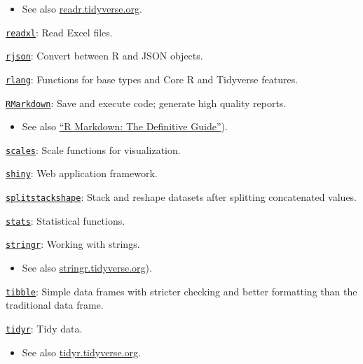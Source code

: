\documentclass[]{book}
\providecommand{\tightlist}{%
  \setlength{\itemsep}{0pt}\setlength{\parskip}{0pt}}
\theoremstyle{definition}
\theoremstyle{definition}
\theoremstyle{definition}
\theoremstyle{remark}
\begin{document}
\begin{itemize}
\tightlist
\item
  See also \href{https://readr.tidyverse.org/}{readr.tidyverse.org}.
\end{itemize}

\href{https://CRAN.R-project.org/package=readxl}{\texttt{readxl}}: Read
Excel files.

\href{https://CRAN.R-project.org/package=rjson}{\texttt{rjson}}: Convert
between R and JSON objects.

\href{https://CRAN.R-project.org/package=rlang}{\texttt{rlang}}:
Functions for base types and Core R and Tidyverse features.

\href{https://CRAN.R-project.org/package=rmarkdown}{\texttt{RMarkdown}}:
Save and execute code; generate high quality reports.

\begin{itemize}
\tightlist
\item
  See also \href{https://bookdown.org/yihui/rmarkdown/}{``R Markdown:
  The Definitive Guide''}).
\end{itemize}

\href{https://CRAN.R-project.org/package=scales}{\texttt{scales}}: Scale
functions for visualization.

\href{https://CRAN.R-project.org/package=shiny}{\texttt{shiny}}: Web
application framework.

\href{https://CRAN.R-project.org/package=splitstackshape}{\texttt{splitstackshape}}:
Stack and reshape datasets after splitting concatenated values.

\href{https://www.rdocumentation.org/packages/stats/versions/3.5.1}{\texttt{stats}}:
Statistical functions.

\href{https://CRAN.R-project.org/package=stringr}{\texttt{stringr}}:
Working with strings.

\begin{itemize}
\tightlist
\item
  See also
  \href{https://stringr.tidyverse.org/}{stringr.tidyverse.org}).
\end{itemize}

\href{https://CRAN.R-project.org/package=tibble}{\texttt{tibble}}:
Simple data frames with stricter checking and better formatting than the
traditional data frame.

\href{https://CRAN.R-project.org/package=tidyr}{\texttt{tidyr}}: Tidy
data.

\begin{itemize}
\tightlist
\item
  See also \href{https://tidyr.tidyverse.org/}{tidyr.tidyverse.org}.
\end{itemize}
\end{document}
